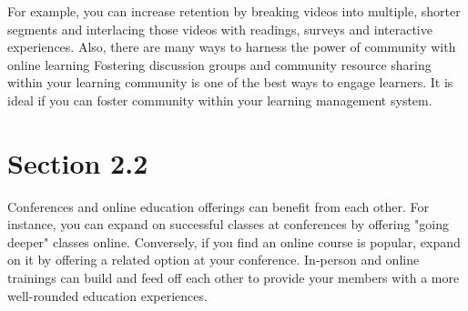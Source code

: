 For example, you can increase retention by breaking videos into multiple, shorter segments and interlacing those videos with readings, surveys and interactive experiences. Also, there are many ways to harness the power of community with online learning Fostering discussion groups and community resource sharing within your learning community is one of the best ways to engage learners. It is ideal if you can foster community within your learning management system.

\section{Section 2.2}
\label{section:2-2}
Conferences and online education offerings can benefit from each other. For instance, you can expand on successful classes at conferences by offering "going deeper" classes online. Conversely, if you find an online course is popular, expand on it by offering a related option at your conference. In-person and online trainings can build and feed off each other to provide your members with a more well-rounded education experiences. 
